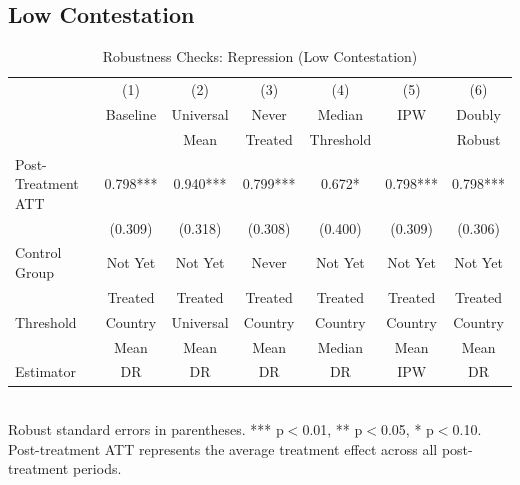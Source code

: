 \documentclass[bibtex]{article}
\begin{document}
{\subsection{Low Contestation}

\begin{table}[H]
\centering
\caption{Robustness Checks:  Repression  (Low  Contestation)}
\label{tab:robust_ rep _ low }
\begin{tabular}{lcccccc}
\toprule
 & (1) & (2) & (3) & (4) & (5) & (6) \\
 & Baseline & Universal & Never & Median & IPW & Doubly \\
 &  & Mean & Treated & Threshold &  & Robust \\
\midrule
Post-Treatment ATT &  0.798***  &  0.940***  &  0.799***  &  0.672*  &  0.798***  &  0.798***  \\
 &  (0.309)  &  (0.318)  &  (0.308)  &  (0.400)  &  (0.309)  &  (0.306)  \\
\midrule
Control Group & Not Yet & Not Yet & Never & Not Yet & Not Yet & Not Yet \\
 & Treated & Treated & Treated & Treated & Treated & Treated \\
Threshold & Country & Universal & Country & Country & Country & Country \\
 & Mean & Mean & Mean & Median & Mean & Mean \\
Estimator & DR & DR & DR & DR & IPW & DR \\
\bottomrule
\end{tabular}\\
Robust standard errors in parentheses. *** p$<$0.01, ** p$<$0.05, * p$<$0.10. Post-treatment ATT represents the average treatment effect across all post-treatment periods.
\end{table}


}
\end{document}
